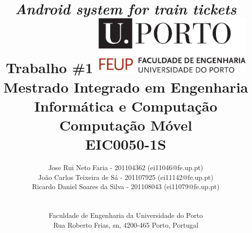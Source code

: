 \documentclass[12pt]{article}
\begin{document}
\setlength{\textwidth}{16cm}
\setlength{\textheight}{22cm}
\title{\huge\textbf{\textit{Android system for train tickets}}\linebreak
\Large\textbf{\\Trabalho \#1}\linebreak\linebreak\linebreak
\includegraphics[width=8cm]{feup.pdf}\linebreak \linebreak
\large{Mestrado Integrado em Engenharia Informática e Computação} \linebreak
\large{Computação Móvel \\ EIC0050-1S}\linebreak
}
\author{
Jose Rui Neto Faria - 201104362 (ei11046@fe.up.pt)\\
João Carlos Teixeira de Sá - 201107925 (ei11142@fe.up.pt)\\
Ricardo Daniel Soares da Silva - 201108043 (ei11079@fe.up.pt)\\
\\
\\ Faculdade de Engenharia da Universidade do Porto \\ Rua Roberto Frias, s\/n, 4200-465 Porto, Portugal
 \vspace{1cm}}
\maketitle
\thispagestyle{empty}


\newpage

\tableofcontents


\end{document}

